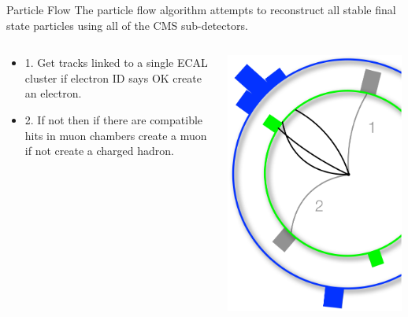 \begin{frame}{Particle Flow}
The particle flow algorithm attempts to reconstruct all stable final state particles using all of the CMS sub-detectors.

\begin{columns}[T]
  \begin{column}{0.6\textwidth}
\footnotesize
    \begin{itemize}
\footnotesize
    \item
      1. Get tracks linked to a single ECAL cluster if electron ID says OK create an electron.
    \item
      2. If not then if there are compatible hits in muon chambers create a muon if not create a charged hadron.
    \end{itemize}
  \end{column}
  \begin{column}{0.40\textwidth}
    \includegraphics[width=0.99\textwidth]{images/pf2.pdf}
  \end{column}
\end{columns}
\end{frame}


